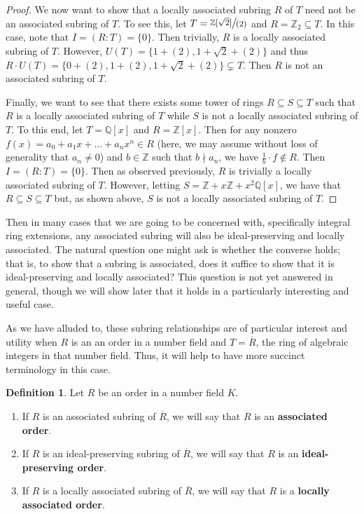 \documentclass[12pt]{amsart}
\theoremstyle{definition}
\newtheorem{definition}[theorem]{Definition}
\newcommand{\bZ}{\mathbb Z}
\newcommand{\bQ}{\mathbb Q}
\newcommand{\Rbar}{\overline{R}}
\newcommand{\term}[1]{\textbf{\textup{#1}}}
\newcommand{\quot}[2]{\large\sfrac{#1}{#2}\normalsize}
\begin{document}
\begin{proof}
		We now want to show that a locally associated subring $R$ of $T$ need not be an associated subring of $T$. To see this, let $T=\quot{\bZ[\sqrt{2}]}{(2)}$ and $R=\bZ_2\subseteq T$. In this case, note that $I=(R:T)=\{0\}$. Then trivially, $R$ is a locally associated subring of $T$. However, $U(T)=\{1+(2),1+\sqrt{2}+(2)\}$ and thus $R\cdot U(T)=\{0+(2),1+(2),1+\sqrt{2}+(2)\}\subsetneq T$. Then $R$ is not an associated subring of $T$.
		
		Finally, we want to see that there exists some tower of rings $R\subseteq S\subseteq T$ such that $R$ is a locally associated subring of $T$ while $S$ is not a locally associated subring of $T$. 
		To this end, let $T=\bQ[x]$ and $R=\bZ[x]$. Then for any nonzero $f(x)=a_0+a_1x+\dots+a_nx^n\in R$ (here, we may assume without loss of generality that $a_n\neq 0$) and $b\in\bZ$ such that $b\nmid a_n$, we have $\frac{1}{b}\cdot f\notin R$. Then $I=(R:T)=\{0\}$. Then as observed previously, $R$ is trivially a locally associated subring of $T$. However, letting $S=\bZ+x\bZ+x^2\bQ[x]$, we have that $R\subseteq S\subseteq T$ but, as shown above, $S$ is not a locally associated subring of $T$.
	\end{proof}
	
	Then in many cases that we are going to be concerned with, specifically integral ring extensions, any associated subring will also be ideal-preserving and locally associated. The natural question one might ask is whether the converse holds; that is, to show that a subring is associated, does it suffice to show that it is ideal-preserving and locally associated? This question is not yet answered in general, though we will show later that it holds in a particularly interesting and useful case.
	
	As we have alluded to, these subring relationships are of particular interest and utility when $R$ is an an order in a number field and $T=\Rbar$, the ring of algebraic integers in that number field. Thus, it will help to have more succinct terminology in this case.
	
	\begin{definition}
		Let $R$ be an order in a number field $K$.
		\begin{enumerate}
			\item If $R$ is an associated subring of $\Rbar$, we will say that $R$ is an \term{associated order}.
			\item If $R$ is an ideal-preserving subring of $\Rbar$, we will say that $R$ is an \term{ideal-preserving order}.
			\item If $R$ is a locally associated subring of $\Rbar$, we will say that $R$ is a \term{locally associated order}.
		\end{enumerate}
	\end{definition}
	
\end{document}
